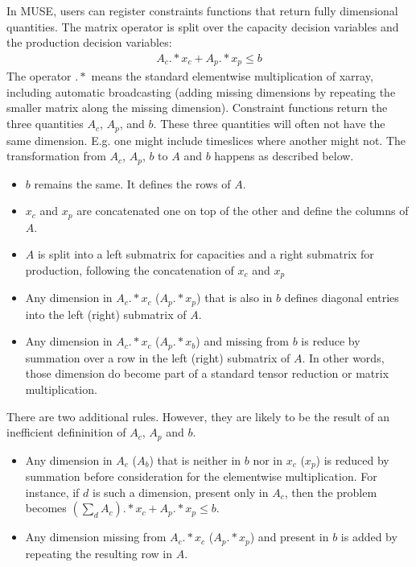\documentclass[letterpaper,10pt,english]{sphinxmanual}
\begin{document}
In MUSE, users can register constraints functions that return fully dimensional
quantities. The matrix operator is split over the capacity decision variables and the
production decision variables:
\begin{equation*}
\begin{split}A_c .* x_c + A_p .* x_p \leq b\end{split}
\end{equation*}
The operator \(.*\) means the standard elementwise multiplication of xarray,
including automatic broadcasting (adding missing dimensions by repeating the smaller
matrix along the missing dimension).  Constraint functions return the three quantities
\(A_c\), \(A_p\), and \(b\). These three quantities will often not have the
same dimension. E.g. one might include timeslices where another might not. The
transformation from \(A_c\), \(A_p\), \(b\) to \(A\) and \(b\)
happens as described below.
\begin{itemize}
\item {} 
\(b\) remains the same. It defines the rows of \(A\).

\item {} 
\(x_c\) and \(x_p\) are concatenated one on top of the other and define the
columns of \(A\).

\item {} 
\(A\) is split into a left submatrix for capacities and a right submatrix for
production, following the concatenation of \(x_c\) and \(x_p\)

\item {} 
Any dimension in \(A_c .* x_c\) (\(A_p .* x_p\)) that is also in \(b\)
defines diagonal entries into the left (right) submatrix of \(A\).

\item {} 
Any dimension in \(A_c .* x_c\) (\(A_p .* x_b\)) and missing from
\(b\) is reduce by summation over a row in the left (right) submatrix of
\(A\). In other words, those dimension do become part of a standard tensor
reduction or matrix multiplication.

\end{itemize}

There are two additional rules. However, they are likely to be the result of an
inefficient defininition of \(A_c\), \(A_p\) and \(b\).
\begin{itemize}
\item {} 
Any dimension in \(A_c\) (\(A_b\)) that is neither in \(b\) nor in
\(x_c\) (\(x_p\)) is reduced by summation before consideration for the
elementwise multiplication. For instance, if \(d\) is such a dimension, present
only in \(A_c\), then the problem becomes \((\sum_d A_c) .* x_c + A_p .* x_p
\leq b\).

\item {} 
Any dimension missing from \(A_c .* x_c\) (\(A_p .* x_p\)) and present in
\(b\) is added by repeating the resulting row in \(A\).

\end{itemize}
\end{document}

